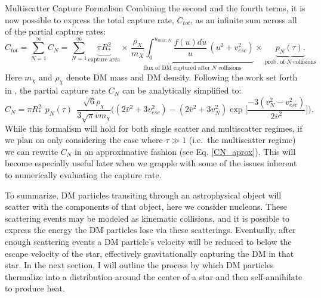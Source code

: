 \documentclass[a4paper,11pt]{article}
\begin{document}
\begin{section}{Multiscatter Capture Formalism}
    Combining the second and the fourth terms, it is now possible to express the total capture rate, $C_{tot}$, as an infinite sum across all of the partial capture rates:
    \begin{equation}
    C_{tot} = \sum_{N=1}^{\infty} C_{N} = \sum_{N=1}^{\infty} \underbrace{\pi R_*^2}_\textrm{capture area}\times \,\underbrace{\frac{\rho_X}{m_X} \int_0^{u_{max;N}} \dfrac{f(u)du}{u}\,(u^2+v_{ esc}^2)}_\textrm{flux of DM captured after $N$ collisions}\times \, \underbrace{p_{ N}(\tau).}_\textrm{prob. of $N$ collisions}
    \end{equation}
    Here $m_\chi$ and $\rho_\chi$ denote DM mass and DM density. 
    Following the work set forth in \cite{Bramante:2017}, the partial capture rate $C_N$ can be analytically simplified to:
    \begin{equation}
        C_N = \pi R_{*}^2 ~~ p_N(\tau)~~ \frac{\sqrt{6}\rho_{\chi}}{3\sqrt{\pi}\bar{v}m_{\chi}}\Bigg((2\bar{v}^2 + 3v_{esc}^2) - (2\bar{v}^2 + 3v_{N}^2) \exp\Big[\frac{-3(v_N^2 - v_{esc}^2)}{2\bar{v}^2} \Big]    \Bigg). 
        \label{eq22}
    \end{equation}
    While this formalism will hold for both single scatter and multiscatter regimes, if we plan on only considering the case where $\tau \gg 1$ (i.e.~the multiscatter regime) we can rewrite $C_N$ in an approximative fashion (see Eq. \ref{CN_aprox}).
    This will become especially useful later when we grapple with some of the issues inherent to numerically evaluating the capture rate.

    To summarize, DM particles transiting through an astrophysical object will scatter with the components of that object, here we consider nucleons.
    These scattering events may be modeled as kinematic collisions, and it is possible to express the energy the DM particles lose via these scatterings.
    Eventually, after enough scattering events a DM particle's velocity will be reduced to below the escape velocity of the star, effectively gravitationally capturing the DM in that star.
    In the next section, I will outline the process by which DM particles thermalize into a distribution around the center of a star and then self-annihilate to produce heat.
\end{section}
\end{document}
